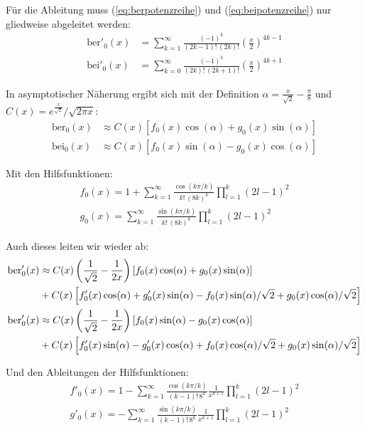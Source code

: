 \documentclass[10pt,a4paper]{article}
\begin{document}
Für die Ableitung muss (\ref{eq:berpotenzreihe}) und (\ref{eq:beipotenzreihe}) nur gliedweise abgeleitet werden:
\begin{align}
	\mathrm{ber}'_0(x) &= \sum^{\infty}_{k=1} \frac{\left( -1 \right)^k}{\left( 2k-1 \right)! \, \left( 2k \right)!} \left( \frac{x}{2} \right)^{4k-1}\\
	\mathrm{bei}'_0(x) &= \sum^{\infty}_{k=0} \frac{\left( -1 \right)^k}{\left( 2k \right)! \, \left( 2k+1 \right)!} \left( \frac{x}{2} \right)^{4k+1}
\end{align}

In asymptotischer Näherung \cite{abramowitzstegun} ergibt sich mit der Definition $\alpha = \frac{x}{\sqrt{2}}-\frac{\pi}{8}$ und $C(x) = e^{\frac{x}{\sqrt{2}}}/\sqrt{2 \pi x} $:
\begin{align}
	\mathrm{ber}_0(x) &\approx C(x) \left[f_0(x) \cos(\alpha) + g_0(x) \sin(\alpha) \right]\label{eq:berpotenzreiheasym}\\
	\mathrm{bei}_0(x) &\approx C(x) \left[f_0(x) \sin(\alpha) - g_0(x) \cos(\alpha) \right]\label{eq:beipotenzreiheasym}
\end{align}

Mit den Hilfsfunktionen:
\begin{align}
	f_0(x) = 1 + \sum^{\infty}_{k=1} \frac{\cos(k \pi / k)}{k! \, (8k)^k} \prod^{k}_{l=1}(2l - 1)^2\\
	g_0(x) = \sum^{\infty}_{k=1} \frac{\sin(k \pi / k)}{k! \, (8k)^k} \prod^{k}_{l=1}(2l - 1)^2
\end{align}

Auch dieses leiten wir wieder ab:
\begin{align}
	\mathrm{ber}'_0(x) &\approx C(x) \left( \frac{1}{\sqrt{2}} - \frac{1}{2x} \right) \left[f_0(x) \cos(\alpha) + g_0(x) \sin(\alpha) \right] \notag\\ & + C(x) \left[ f'_0(x) \cos(\alpha) + g'_0(x) \sin(\alpha) - f_0(x) \sin(\alpha)/\sqrt{2} + g_0(x) \cos(\alpha)/\sqrt{2} \right]\label{eq:dberpotenzreiheasym}\\
	\mathrm{ber}'_0(x) &\approx C(x) \left( \frac{1}{\sqrt{2}} - \frac{1}{2x} \right) \left[f_0(x) \sin(\alpha) - g_0(x) \cos(\alpha) \right] \notag\\ & + C(x) \left[ f'_0(x) \sin(\alpha) - g'_0(x) \cos(\alpha) + f_0(x) \cos(\alpha)/\sqrt{2} + g_0(x) \sin(\alpha)/\sqrt{2} \right] \label{eq:dbeipotenzreiheasym}
\end{align}

Und den Ableitungen der Hilfsfunktionen:
\begin{align}
	f'_0(x) = 1 - \sum^{\infty}_{k=1} \frac{\cos(k \pi / k)}{(k-1)! \, 8^k} \frac{1}{x^{k+1}} \prod^{k}_{l=1}(2l - 1)^2\\
	g'_0(x) = -\sum^{\infty}_{k=1} \frac{\sin(k \pi / k)}{(k-1)! \, 8^k} \frac{1}{x^{k+1}} \prod^{k}_{l=1}(2l - 1)^2
\end{align}
\end{document}
